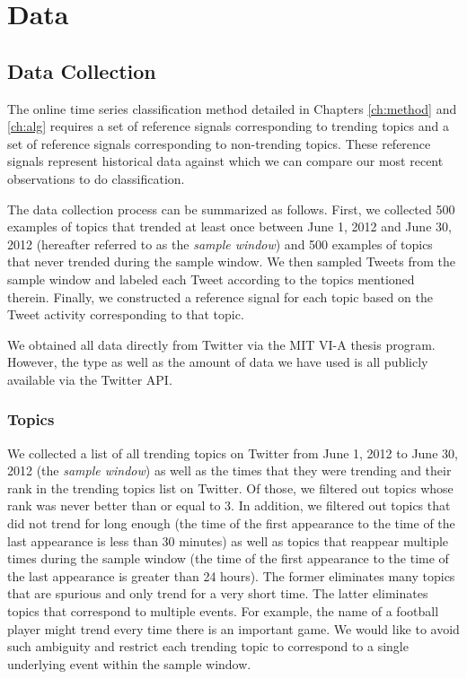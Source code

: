 \section{Data}
\subsection{Data Collection}
The online time series classification method detailed in Chapters
\ref{ch:method} and \ref{ch:alg} requires a set of reference signals
corresponding to trending topics and a set of reference signals corresponding to
non-trending topics. These reference signals represent historical data against
which we can compare our most recent observations to do classification.

The data collection process can be summarized as follows. First, we collected
500 examples of topics that trended at least once between June 1, 2012 and June
30, 2012 (hereafter referred to as the {\em sample window}) and 500 examples of
topics that never trended during the sample window. We then sampled Tweets from the
sample window and labeled each Tweet according to the topics mentioned
therein. Finally, we constructed a reference signal for each topic based on the
Tweet activity corresponding to that topic.

We obtained all data directly from Twitter via the MIT VI-A thesis
program. However, the type as well as the amount of data we have used is all
publicly available via the Twitter API.

\subsubsection{Topics}
We collected a list of all trending topics on Twitter from June 1, 2012 to June
30, 2012 (the {\em sample window}) as well as the times that they were trending
and their rank in the trending topics list on Twitter. Of those, we filtered out
topics whose rank was never better than or equal to 3. In addition, we filtered
out topics that did not trend for long enough (the time of the first appearance
to the time of the last appearance is less than 30 minutes) as well as topics
that reappear multiple times during the sample window (the time of the first
appearance to the time of the last appearance is greater than 24 hours). The
former eliminates many topics that are spurious and only trend for a very short
time. The latter eliminates topics that correspond to multiple events. For
example, the name of a football player might trend every time there is an
important game. We would like to avoid such ambiguity and restrict each trending
topic to correspond to a single underlying event within the sample window.

